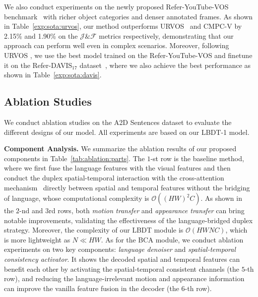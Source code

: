\documentclass[10pt,twocolumn,letterpaper]{article}
\begin{document}
We also conduct experiments on the newly proposed Refer-YouTube-VOS benchmark~\cite{seo2020urvos} with richer object categories and denser annotated frames.
As shown in Table~\ref{exp:sota:urvos}, our method outperforms URVOS~\cite{seo2020urvos} and CMPC-V \cite{liu2021cross} by 2.15\% and 1.90\% on the $\mathcal{J}\&\mathcal{F}$ metrics respectively, demonstrating that our approach can perform well even in complex scenarios.  Moreover, following URVOS \cite{seo2020urvos}, we use the best model trained on the Refer-YouTube-VOS and finetune it on the Refer-DAVIS$_{17}$ dataset~\cite{khoreva2018video}, where we also achieve the best performance as shown in Table~\ref{exp:sota:davis}.

\subsection{Ablation Studies}

We conduct ablation studies on the A2D Sentences dataset to evaluate the different designs of our model.
All experiments are based on our LBDT-1 model.




\textbf{Component Analysis.} We summarize the ablation results of our proposed components in Table~\ref{tab:ablation:parts}.
The $1$-st row is the baseline method, where we first fuse the language features with the visual features and then conduct the duplex spatial-temporal interaction with the cross-attention mechanism~\cite{vaswani2017attention} directly between spatial and temporal features without the bridging of language, whose computational complexity is $\mathcal{O}((HW)^2C)$.
As shown in the $2$-nd and 3rd rows, both \textit{motion transfer} and \textit{appearance transfer} can bring notable improvements, validating the effectiveness of the language-bridged duplex strategy.
Moreover, the complexity of our LBDT module is $\mathcal{O}(HWNC)$, which is more lightweight as $N\ll HW$.
As for the BCA module, we conduct ablation experiments on two key components: \textit{language denoiser} and \textit{spatial-temporal consistency activator}.
It shows the decoded spatial and temporal features can benefit each other by activating the spatial-temporal consistent channels (the $5$-th row), and reducing the language-irrelevant motion and appearance information can improve the vanilla feature fusion in the decoder (the $6$-th row).
\end{document}
